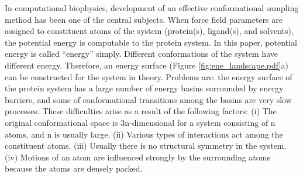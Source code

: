 In computational biophysics, development of an effective conformational sampling method has been one of the central subjects. When force field parameters are assigned to constituent atoms of the system (protein(s), ligand(s), and solvents), the potential energy is computable to the protein system. In this paper, potential energy is called “energy” simply. Different conformations of the system have different energy. Therefore, an energy surface (Figure \ref{fig:ene_landscape.pdf}a) can be constructed for the system in theory. Problems are: the energy surface of the protein system has a large number of energy basins surrounded by energy barriers, and some of conformational transitions among the basins are very slow processes. These difficulties arise as a result of the following factors: (i) The original conformational space is 3n-dimensional for a system consisting of n atoms, and n is usually large. (ii) Various types of interactions act among the constituent atoms. (iii) Usually there is no structural symmetry in the system. (iv) Motions of an atom are influenced strongly by the surrounding atoms because the atoms are densely packed. 
